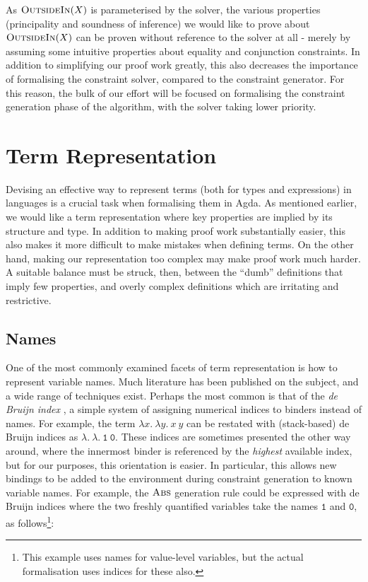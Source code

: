 \documentclass[a4paper]{jfp}
\newcommand{\outsidein}{\textsc{OutsideIn}(X)}
\begin{document}
As $\outsidein$ is parameterised by the solver, the various properties (principality and soundness of inference) we would like to prove about $\outsidein$ can be proven without reference to the solver at all - merely by assuming some intuitive properties about equality and conjunction constraints. In addition to simplifying our proof work greatly, this also decreases the importance of formalising the constraint solver, compared to the constraint generator. For this reason, the bulk of our effort will be focused on formalising the constraint generation phase of the algorithm, with the solver taking lower priority.

\section{Term Representation}

Devising an effective way to represent terms (both for types and expressions) in languages is a crucial task when formalising them in Agda. As mentioned earlier, we would like a term representation where key properties are implied by its structure and type. In addition to making proof work substantially easier, this also makes it more difficult to make mistakes when defining terms. On the other hand, making our representation too complex may make proof work much harder. A suitable balance must be struck, then, between the ``dumb'' definitions that imply few properties, and overly complex definitions which are irritating and restrictive.

\subsection{Names}

One of the most commonly examined facets of term representation is how to represent variable names. Much literature has been published on the subject, and a wide range of techniques exist. Perhaps the most common is that of the \emph{de Bruijn index} \cite{deBruijn:1972tm}, a simple system of assigning numerical indices to binders instead of names. For example, the term $\lambda x.\ \lambda y.\ x\ y$ can be restated with (stack-based) de Bruijn indices as $\lambda.\ \lambda.\ \mathtt{1}\ \mathtt{0}$. These indices are sometimes presented the other way around, where the innermost binder is referenced by the \emph{highest} available index, but for our purposes, this orientation is easier. In particular, this allows new bindings to be added to the environment during constraint generation to known variable names. For example, the $\textsc{Abs}$ generation rule could be expressed with de Bruijn indices where the two freshly quantified variables take the names $\mathtt{1}$ and $\mathtt{0}$, as follows\footnote{This example uses names for value-level variables, but the actual formalisation uses indices for these also.}:
\end{document}
